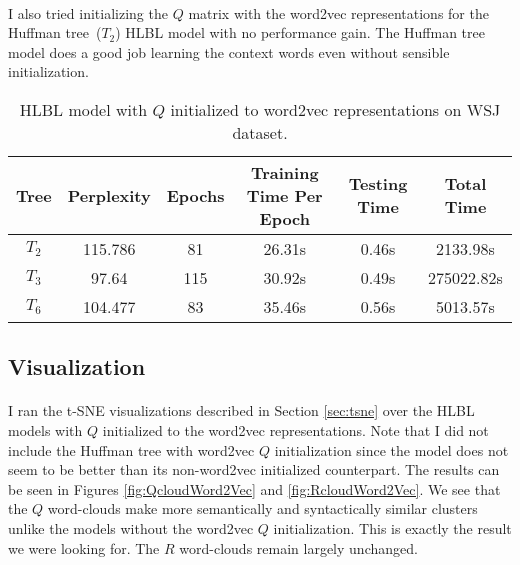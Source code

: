 \paragraph{}
I also tried initializing the $Q$ matrix with the word2vec representations for the Huffman tree~($T_2$) HLBL model with no performance gain. The Huffman tree model does a good job learning the context words even without sensible initialization. 

\begin{table*} \centering
{}
\begin{tabular}{cccccc}\toprule
Tree & Perplexity & Epochs & Training Time Per Epoch & Testing Time & Total Time\\ 
\midrule
$T_2$ & 115.786 & 81 & 26.31s &0.46s & 2133.98s \\
$T_3$ & 97.64 & 115& 30.92s & 0.49s& 275022.82s\\
$T_6$& 104.477 & 83& 35.46s & 0.56s& 5013.57s\\
\bottomrule
\end{tabular}
\caption{HLBL model with $Q$ initialized to word2vec representations on WSJ dataset.}
\label{tab:brownWord2vec}
\end{table*}

\subsection{Visualization}
\paragraph{}
I ran the t-SNE visualizations described in Section \ref{sec:tsne} over the HLBL models with $Q$ initialized to the word2vec representations. Note that I did not include the Huffman tree with word2vec $Q$ initialization since the model does not seem to be better than its non-word2vec initialized counterpart. The results can be seen in Figures \ref{fig:QcloudWord2Vec} and \ref{fig:RcloudWord2Vec}. We see that the $Q$ word-clouds make more semantically and syntactically similar clusters unlike the models without the word2vec $Q$ initialization. This is exactly the result we were looking for. The $R$ word-clouds remain largely unchanged. 

